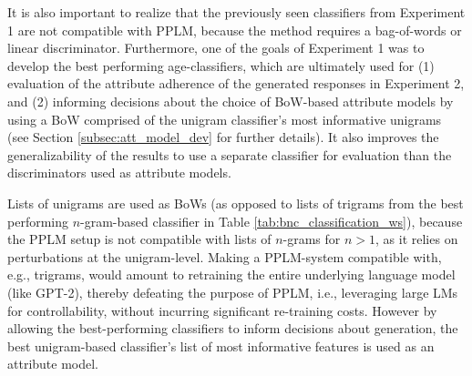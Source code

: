 It is also important to realize that the previously seen classifiers from Experiment 1 are not compatible with PPLM, because the method requires a bag-of-words or linear discriminator. Furthermore, one of the goals of Experiment 1 was to develop the best performing age-classifiers, which are ultimately used for (1) evaluation of the attribute adherence of the generated responses in Experiment 2, and (2) informing decisions about the choice of BoW-based attribute models by using a BoW comprised of the unigram classifier's most informative unigrams (see Section \ref{subsec:att_model_dev} for further details). It also improves the generalizability of the results to use a separate classifier for evaluation than the discriminators used as attribute models.

Lists of unigrams are used as BoWs (as opposed to lists of trigrams from the best performing $n$-gram-based classifier in Table \ref{tab:bnc_classification_ws}), because the PPLM setup is not compatible with lists of $n$-grams for $n > 1$, as it relies on perturbations at the unigram-level. Making a PPLM-system compatible with, e.g., trigrams, would amount to retraining the entire underlying language model (like GPT-2), thereby defeating the purpose of PPLM, i.e., leveraging large LMs for controllability, without incurring significant re-training costs. However by allowing the best-performing classifiers to inform decisions about generation, the best unigram-based classifier's list of most informative features is used as an attribute model.


